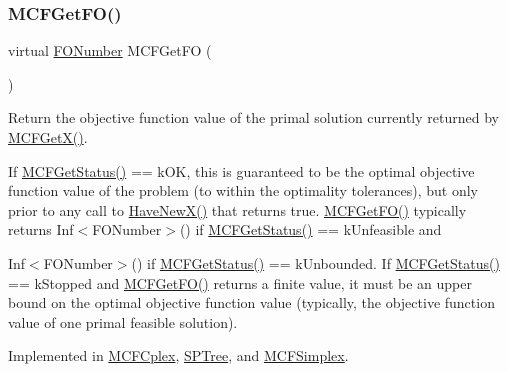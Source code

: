 \subsubsection{\texorpdfstring{M\+C\+F\+Get\+F\+O()}{MCFGetFO()}}
{\footnotesize\ttfamily virtual \mbox{\hyperlink{class_m_c_f_class_af5ee7b3099b0bc780a6a4b43629488fa}{F\+O\+Number}} M\+C\+F\+Get\+FO (\begin{DoxyParamCaption}\item[{void}]{ }\end{DoxyParamCaption})\hspace{0.3cm}{\ttfamily [pure virtual]}}

Return the objective function value of the primal solution currently returned by \mbox{\hyperlink{class_m_c_f_class_a4eb307e0707adaef99bb0e08c9e10eb8}{M\+C\+F\+Get\+X()}}.

If \mbox{\hyperlink{class_m_c_f_class_a333e27ad7a73779b096cb70829cbe8be}{M\+C\+F\+Get\+Status()}} == k\+OK, this is guaranteed to be the optimal objective function value of the problem (to within the optimality tolerances), but only prior to any call to \mbox{\hyperlink{class_m_c_f_class_a7a4966a98c7ffa909057064beb4507a5}{Have\+New\+X()}} that returns true. \mbox{\hyperlink{class_m_c_f_class_a109d7c021feda837d8ca5051fc24b6ea}{M\+C\+F\+Get\+F\+O()}} typically returns Inf$<$\+F\+O\+Number$>$() if \mbox{\hyperlink{class_m_c_f_class_a333e27ad7a73779b096cb70829cbe8be}{M\+C\+F\+Get\+Status()}} == k\+Unfeasible and
\begin{DoxyItemize}
\item Inf$<$\+F\+O\+Number$>$() if \mbox{\hyperlink{class_m_c_f_class_a333e27ad7a73779b096cb70829cbe8be}{M\+C\+F\+Get\+Status()}} == k\+Unbounded. If \mbox{\hyperlink{class_m_c_f_class_a333e27ad7a73779b096cb70829cbe8be}{M\+C\+F\+Get\+Status()}} == k\+Stopped and \mbox{\hyperlink{class_m_c_f_class_a109d7c021feda837d8ca5051fc24b6ea}{M\+C\+F\+Get\+F\+O()}} returns a finite value, it must be an upper bound on the optimal objective function value (typically, the objective function value of one primal feasible solution). 
\end{DoxyItemize}

Implemented in \mbox{\hyperlink{class_m_c_f_cplex_a854a2b3ad7bb3cca0326c8f581a2d673}{M\+C\+F\+Cplex}}, \mbox{\hyperlink{class_s_p_tree_a55b9b095d557852a91b68c973236518a}{S\+P\+Tree}}, and \mbox{\hyperlink{class_m_c_f_simplex_a854a2b3ad7bb3cca0326c8f581a2d673}{M\+C\+F\+Simplex}}.

\mbox{\label{class_m_c_f_class_a8c573c04800332c86ea31aeb80bbd7b1}} 
